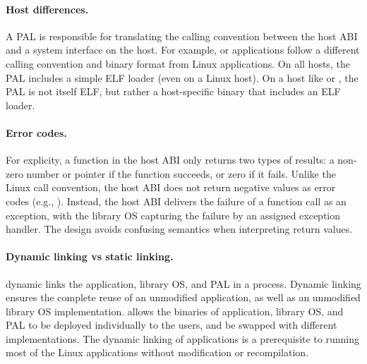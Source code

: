 


\paragraph{Host differences.}
A PAL is responsible for translating the calling convention between the host ABI and a system interface on the host.
For example,
\win{} or \osx{} applications follow a different calling convention and binary format
from Linux applications.
On all hosts, the PAL includes a simple ELF loader (even on a Linux host).
On a host like \win{} or \osx{}, the PAL is not itself ELF,
but rather a host-specific binary that includes an ELF loader.




\paragraph{Error codes.}
For explicity, a function in the host ABI only returns two types of results:
a non-zero number or pointer if the function succeeds, or zero if it fails.
Unlike the Linux call convention, the host ABI does not return negative values as error codes (e.g., ).
Instead, the host ABI delivers the failure of a function call
as an exception, with the library OS capturing the failure by an assigned exception handler.
The design avoids confusing semantics
when interpreting return values.



\paragraph{Dynamic linking vs static linking.}
\graphene{} dynamic links the application, library OS, and PAL
in a process.
Dynamic linking ensures the complete reuse of an unmodified application,
as well as an unmodified library OS implementation.
\graphene{} allows the binaries of application, library OS, and PAL to be deployed individually to the users,
and be swapped with different implementations.
The dynamic linking of applications is a prerequisite
to running most of the Linux applications without modification or recompilation.




